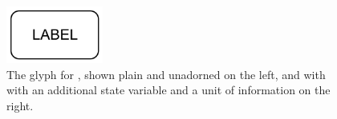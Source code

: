 \begin{figure}[H]
  \centering
  \includegraphics[width = 1.25in]{images/macromolecule-plain} \hspace*{2em}
  \caption{The \PD glyph for , shown plain and
    unadorned on the left, and with with an additional state variable and a
    unit of information on the right.}
  \label{fig:macromolecule}
\end{figure}





